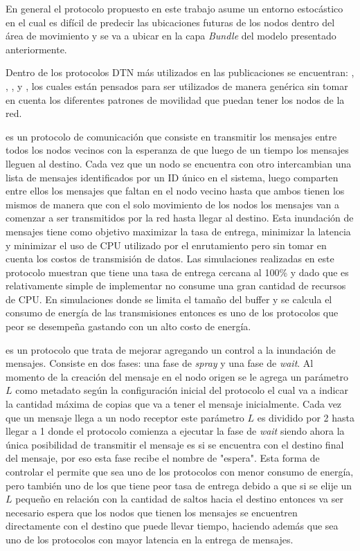 En general el protocolo propuesto en este trabajo asume un entorno estocástico
en el cual es difícil de predecir las ubicaciones futuras de los nodos dentro
del área de movimiento y se va a ubicar en la capa \textit{Bundle} del modelo
presentado anteriormente.


Dentro de los protocolos DTN más utilizados en las publicaciones se encuentran:
\epidemic{}, \syw{}, \syf{}, \maxprop{} y \prophet{}, los cuales están pensados
para ser utilizados de manera genérica sin tomar en cuenta los diferentes
patrones de movilidad que puedan tener los nodos de la red.


\epidemic{} \cite{amin_vahdat_epidemic_2000} es un protocolo de comunicación que
consiste en transmitir los mensajes entre todos los nodos vecinos con la
esperanza de que luego de un tiempo los mensajes lleguen al destino. Cada vez
que un nodo se encuentra con otro intercambian una lista de mensajes
identificados por un ID único en el sistema, luego comparten entre ellos los
mensajes que faltan en el nodo vecino hasta que ambos tienen los mismos de
manera que con el solo movimiento de los nodos los mensajes van a comenzar a ser
transmitidos por la red hasta llegar al destino.  Esta inundación de mensajes
tiene como objetivo maximizar la tasa de entrega, minimizar la latencia y
minimizar el uso de CPU utilizado por el enrutamiento pero sin tomar en cuenta
los costos de transmisión de datos. Las simulaciones realizadas en este
protocolo muestran que tiene una tasa de entrega cercana al 100\% y dado que es
relativamente simple de implementar no consume una gran cantidad de recursos de
CPU. En simulaciones \cite{paper_evaluacion_nosotros} donde se limita el tamaño
del buffer y se calcula el consumo de energía de las transmisiones entonces es
uno de los protocolos que peor se desempeña gastando con un alto costo de
energía.

\syw{} \cite{spyropoulos_spray_2005} es un protocolo que trata de mejorar
\epidemic{} agregando un control a la inundación de mensajes. Consiste en dos
fases: una fase de \textit{spray} y una fase de \textit{wait}. Al momento de la
creación del mensaje en el nodo origen se le agrega un parámetro $L$ como
metadato según la configuración inicial del protocolo el cual va a indicar la
cantidad máxima de copias que va a tener el mensaje inicialmente. Cada vez que
un mensaje llega a un nodo receptor este parámetro $L$ es dividido por 2 hasta
llegar a 1 donde el protocolo comienza a ejecutar la fase de \textit{wait}
siendo ahora la única posibilidad de transmitir el mensaje es si se encuentra
con el destino final del mensaje, por eso esta fase recibe el nombre de
"espera". Esta forma de controlar el \overhead{} permite que \syw{} sea uno de
los protocolos con menor consumo de energía, pero también uno de los que tiene
peor tasa de entrega debido a que si se elije un $L$ pequeño en relación con la
cantidad de saltos hacia el destino entonces va ser necesario espera que los
nodos que tienen los mensajes se encuentren directamente con el destino que
puede llevar tiempo, haciendo además que sea uno de los protocolos con mayor
latencia en la entrega de mensajes.


